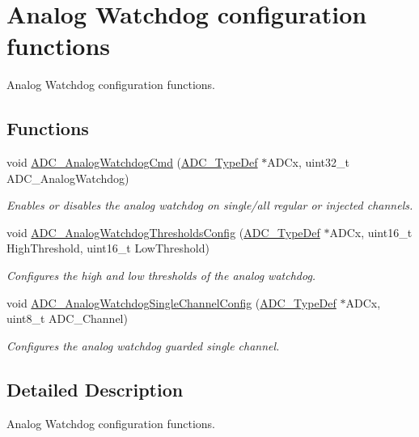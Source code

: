 \hypertarget{group___a_d_c___group2}{}\section{Analog Watchdog configuration functions}
\label{group___a_d_c___group2}


Analog Watchdog configuration functions.  


\subsection*{Functions}
\begin{DoxyCompactItemize}
\item 
void \hyperlink{group___a_d_c___group2_gad017d69bec6e497afd35ba25ea22d86e}{A\+D\+C\+\_\+\+Analog\+Watchdog\+Cmd} (\hyperlink{struct_a_d_c___type_def}{A\+D\+C\+\_\+\+Type\+Def} $\ast$A\+D\+Cx, uint32\+\_\+t A\+D\+C\+\_\+\+Analog\+Watchdog)
\begin{DoxyCompactList}\small\item\em Enables or disables the analog watchdog on single/all regular or injected channels. \end{DoxyCompactList}\item 
void \hyperlink{group___a_d_c___group2_ga79588d02aa8e4147f21cb90a4708366d}{A\+D\+C\+\_\+\+Analog\+Watchdog\+Thresholds\+Config} (\hyperlink{struct_a_d_c___type_def}{A\+D\+C\+\_\+\+Type\+Def} $\ast$A\+D\+Cx, uint16\+\_\+t High\+Threshold, uint16\+\_\+t Low\+Threshold)
\begin{DoxyCompactList}\small\item\em Configures the high and low thresholds of the analog watchdog. \end{DoxyCompactList}\item 
void \hyperlink{group___a_d_c___group2_ga03cef3d12292ffa2b8520524d5b0226c}{A\+D\+C\+\_\+\+Analog\+Watchdog\+Single\+Channel\+Config} (\hyperlink{struct_a_d_c___type_def}{A\+D\+C\+\_\+\+Type\+Def} $\ast$A\+D\+Cx, uint8\+\_\+t A\+D\+C\+\_\+\+Channel)
\begin{DoxyCompactList}\small\item\em Configures the analog watchdog guarded single channel. \end{DoxyCompactList}\end{DoxyCompactItemize}


\subsection{Detailed Description}
Analog Watchdog configuration functions. 

